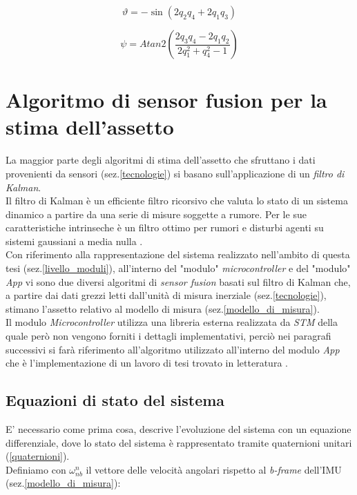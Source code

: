 \begin{equation}
\vartheta = -\sin(2q_2q_4 + 2q_1q_3)
\end{equation}

\begin{equation}
\psi = Atan2\left(  \frac{2q_3 q_4 - 2q_1q_2}{2q_1^2+q_4^2 -1}\right)
\end{equation}


\section{Algoritmo di sensor fusion per la stima dell'assetto}
\label{sensor_fusion}
La maggior parte degli algoritmi di stima dell'assetto che sfruttano i dati provenienti da sensori (sez.\ref{tecnologie}) si basano sull'applicazione di un \textit{filtro di Kalman}.\\
Il filtro di Kalman è un efficiente filtro ricorsivo che valuta lo stato di un sistema dinamico a partire da una serie di misure soggette a rumore. Per le sue caratteristiche intrinseche è un filtro ottimo per rumori e disturbi agenti su sistemi gaussiani a media nulla \cite{kalmanWiki}.\\
Con riferimento alla rappresentazione del sistema realizzato nell'ambito di questa tesi (sez.\ref{livello_moduli}), all'interno del "modulo" \textit{microcontroller} e del "modulo" \textit{App} vi sono due diversi algoritmi di \textit{sensor fusion} basati sul filtro di Kalman che, a partire dai dati grezzi letti dall'unità di misura inerziale (sez.\ref{tecnologie}), stimano l'assetto relativo al modello di misura (sez.\ref{modello_di_misura}).\\
Il modulo \textit{Microcontroller} utilizza una libreria esterna realizzata da \textit{STM} \cite{motion} della quale però non vengono forniti i dettagli implementativi, perciò nei paragrafi successivi si farà riferimento all'algoritmo utilizzato all'interno del modulo \textit{App} che è  l'implementazione di un lavoro di tesi trovato in letteratura \cite{trackingThesis}.

\subsection{Equazioni di stato del sistema}

 E' necessario come prima cosa, descrive l'evoluzione del sistema con un equazione differenziale, dove lo stato del sistema è rappresentato tramite quaternioni unitari (\ref{quaternioni}).\\
 Definiamo con $\omega_{nb}^n$ il vettore delle velocità angolari rispetto al \textit{b-frame} dell'IMU (sez.\ref{modello_di_misura}):
 
